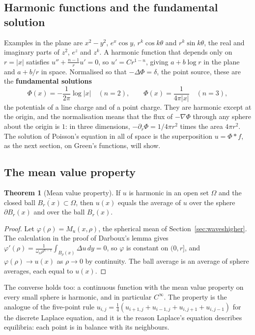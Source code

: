 \documentclass[11pt,a4paper]{article}
\numberwithin{equation}{section}
\theoremstyle{definition}
\newtheorem{thm}{Theorem}[subsection]
\begin{document}
\subsection{Harmonic functions and the fundamental solution}
\label{ssec:harmonic}

Examples in the plane are $x^2 - y^2$, $e^x\cos y$, $r^k\cos k\theta$ and $r^k\sin k\theta$, the real and imaginary parts of $z^2$, $e^z$ and $z^k$. A harmonic function that depends only on $r = |x|$ satisfies $u'' + \frac{n - 1}ru' = 0$, so $u' = Cr^{1 - n}$, giving $a + b\log r$ in the plane and
$a + b/r$ in space. Normalised so that $-\Delta\Phi = \delta$, the point source, these are the \textbf{fundamental solutions}
\[
\Phi(x) = -\frac1{2\pi}\log|x| \quad (n = 2), \qquad \Phi(x) = \frac1{4\pi|x|} \quad (n = 3) ,
\]
the potentials of a line charge and of a point charge. They are harmonic except at the origin, and the normalisation means that the flux of $-\nabla\Phi$ through any sphere about the origin is $1$: in three dimensions, $-\partial_r\Phi = 1/4\pi r^2$ times the area $4\pi r^2$. The solution of Poisson's equation in all of space is
the superposition $u = \Phi * f$, as the next section, on Green's functions, will show.

\subsection{The mean value property}
\label{ssec:meanvalue}

\begin{thm}[Mean value property]
\label{thm:mvp}
If $u$ is harmonic in an open set $\Omega$ and the closed ball $\overline{B_r(x)} \subset \Omega$, then $u(x)$ equals the average of $u$ over the sphere $\partial B_r(x)$ and over the ball $B_r(x)$.
\end{thm}

\begin{proof}
Let $\varphi(\rho) = M_u(x, \rho)$, the spherical mean of Section~\ref{sec:waveshigher}. The calculation in the proof of Darboux's lemma gives $\varphi'(\rho) = \frac{1}{\omega_n\rho^{n - 1}}\int_{B_\rho(x)}\Delta u\,dy = 0$, so $\varphi$ is constant on $(0, r]$, and $\varphi(\rho) \to u(x)$ as $\rho \to 0$ by continuity. The ball average is
an average of sphere averages, each equal to $u(x)$.
\end{proof}

The converse holds too: a continuous function with the mean value property on every small sphere is harmonic, and in particular $C^\infty$. The property is the analogue of the five-point rule $u_{i,j} = \frac14(u_{i+1,j} + u_{i-1,j} + u_{i,j+1} + u_{i,j-1})$ for the discrete Laplace equation, and it is the
reason Laplace's equation describes equilibria: each point is in balance with its neighbours.
\end{document}
